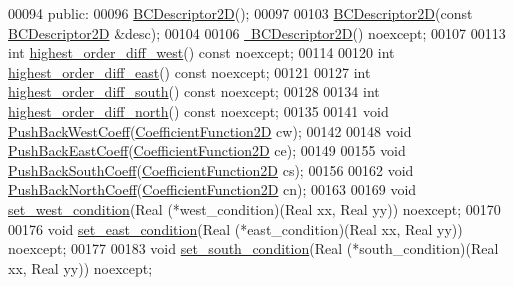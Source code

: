 \begin{DoxyCode}
00094  \textcolor{keyword}{public}:
00096   \hyperlink{classmtk_1_1BCDescriptor2D_abbc3af29202dbfef203f4cafd9566fd0}{BCDescriptor2D}();
00097 
00103   \hyperlink{classmtk_1_1BCDescriptor2D_abbc3af29202dbfef203f4cafd9566fd0}{BCDescriptor2D}(\textcolor{keyword}{const} \hyperlink{classmtk_1_1BCDescriptor2D}{BCDescriptor2D} &desc);
00104 
00106   \hyperlink{classmtk_1_1BCDescriptor2D_ae14e62548a8bc080d576fff6937c546b}{~BCDescriptor2D}() noexcept;
00107 
00113   \textcolor{keywordtype}{int} \hyperlink{classmtk_1_1BCDescriptor2D_a0fa469ddf6ff76e2858d6d3b76cc8b6f}{highest\_order\_diff\_west}() \textcolor{keyword}{const} noexcept;
00114 
00120   \textcolor{keywordtype}{int} \hyperlink{classmtk_1_1BCDescriptor2D_a5a9b80a2e9e579b05d9f3589d80448b6}{highest\_order\_diff\_east}() \textcolor{keyword}{const} noexcept;
00121 
00127   \textcolor{keywordtype}{int} \hyperlink{classmtk_1_1BCDescriptor2D_a463d909f6014e7f01b33171a06d7b400}{highest\_order\_diff\_south}() \textcolor{keyword}{const} noexcept;
00128 
00134   \textcolor{keywordtype}{int} \hyperlink{classmtk_1_1BCDescriptor2D_a87c5f2449247d65ea07784ba2ec61bc7}{highest\_order\_diff\_north}() \textcolor{keyword}{const} noexcept;
00135 
00141   \textcolor{keywordtype}{void} \hyperlink{classmtk_1_1BCDescriptor2D_a3da32ba89cfb15032bb1156394bad98c}{PushBackWestCoeff}(\hyperlink{group__c07-mim__ops_gad9e1c0ace886b0029aefffa5f320e852}{CoefficientFunction2D} cw);
00142 
00148   \textcolor{keywordtype}{void} \hyperlink{classmtk_1_1BCDescriptor2D_a27635428a6c36d1e305cafdc68271063}{PushBackEastCoeff}(\hyperlink{group__c07-mim__ops_gad9e1c0ace886b0029aefffa5f320e852}{CoefficientFunction2D} ce);
00149 
00155   \textcolor{keywordtype}{void} \hyperlink{classmtk_1_1BCDescriptor2D_a9eb891f14c68968a0113632fa5fea630}{PushBackSouthCoeff}(\hyperlink{group__c07-mim__ops_gad9e1c0ace886b0029aefffa5f320e852}{CoefficientFunction2D} cs);
00156 
00162   \textcolor{keywordtype}{void} \hyperlink{classmtk_1_1BCDescriptor2D_a0fed58bd058d699a572888fe4b9934a4}{PushBackNorthCoeff}(\hyperlink{group__c07-mim__ops_gad9e1c0ace886b0029aefffa5f320e852}{CoefficientFunction2D} cn);
00163 
00169   \textcolor{keywordtype}{void} \hyperlink{classmtk_1_1BCDescriptor2D_a006050efe15b1be75b36a74a23051392}{set\_west\_condition}(Real (*west\_condition)(Real xx, Real yy)) noexcept;
00170 
00176   \textcolor{keywordtype}{void} \hyperlink{classmtk_1_1BCDescriptor2D_a4ba8690e845f59a1507b056f3fc8061e}{set\_east\_condition}(Real (*east\_condition)(Real xx, Real yy)) noexcept;
00177 
00183   \textcolor{keywordtype}{void} \hyperlink{classmtk_1_1BCDescriptor2D_a408f159cc44d7ee610191efb8ed48b2a}{set\_south\_condition}(Real (*south\_condition)(Real xx, Real yy)) noexcept;

\end{DoxyCode}
